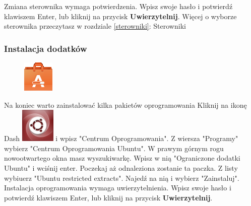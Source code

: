 Zmiana sterownika wymaga potwierdzenia. Wpisz swoje hasło i potwierdź klawiszem Enter, lub kliknij na przycisk \textbf{Uwierzytelnij}. Więcej o wyborze sterownika przeczytasz w rozdziale \ref{sterowniki}: Sterowniki
\clearpage
\subsubsection{Instalacja dodatków}
\begin{figure}
	\includegraphics[width=\linewidth]{images/pierwsze_uruchomienie_dodatki1.png}
\end{figure}

Na koniec warto zainstalować kilka pakietów oprogramowania Kliknij na ikonę Dash \includegraphics[scale=0.35]{images/ikony_dash.png} i wpisz "Centrum Oprogramowania". Z wiersza "Programy" wybierz "Centrum Oprogramowania Ubuntu". W prawym górnym rogu nowootwartego okna masz wyszukiwarkę. Wpisz w nią "Ograniczone dodatki Ubuntu" i wciśnij enter. Poczekaj aż odnaleziona zostanie ta paczka. Z listy wybiuerz "Ubuntu restricted extracts". Najedź na nią i wybierz "Zainstaluj". Instalacja oprogramowania wymaga uwierzytelnienia. Wpisz swoje hasło i potwierdź klawiszem Enter, lub kliknij na przycisk \textbf{Uwierzytelnij}.

